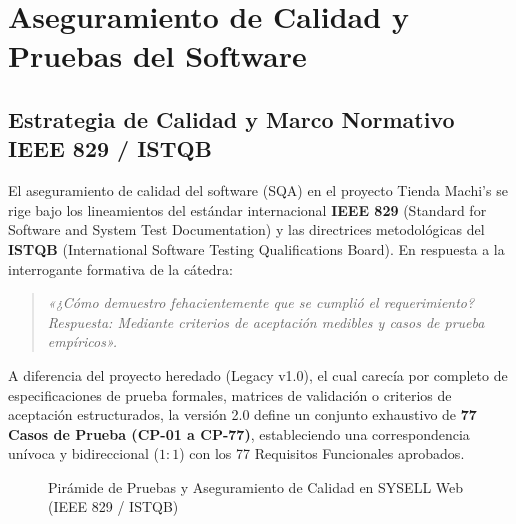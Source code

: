 \chapter{Aseguramiento de Calidad y Pruebas del Software}
\label{cap:calidad_pruebas}

\section{Estrategia de Calidad y Marco Normativo IEEE 829 / ISTQB}
El aseguramiento de calidad del software (SQA) en el proyecto Tienda Machi's se rige bajo los lineamientos del estándar internacional \textbf{IEEE 829} (Standard for Software and System Test Documentation) y las directrices metodológicas del \textbf{ISTQB} (International Software Testing Qualifications Board). En respuesta a la interrogante formativa de la cátedra:
\begin{quote}
\textit{«¿Cómo demuestro fehacientemente que se cumplió el requerimiento? Respuesta: Mediante criterios de aceptación medibles y casos de prueba empíricos».}
\end{quote}

A diferencia del proyecto heredado (Legacy v1.0), el cual carecía por completo de especificaciones de prueba formales, matrices de validación o criterios de aceptación estructurados, la versión 2.0 define un conjunto exhaustivo de \textbf{77 Casos de Prueba (CP-01 a CP-77)}, estableciendo una correspondencia unívoca y bidireccional ($1:1$) con los 77 Requisitos Funcionales aprobados.

\begin{figure}[H]
\centering
{}
\caption{Pirámide de Pruebas y Aseguramiento de Calidad en SYSELL Web (IEEE 829 / ISTQB)}
\label{fig:piramide_pruebas}
\end{figure}

